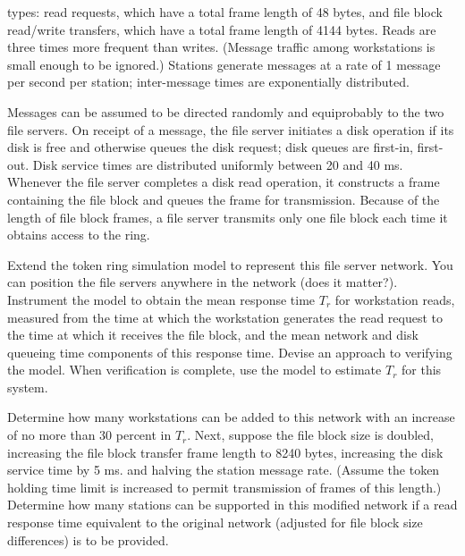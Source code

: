 \noindent types: read requests, which have a total frame length of 48 bytes, and file block read/write transfers, which have a total frame length of 4144 bytes. Reads are three times more frequent than writes. (Message traffic among workstations is small enough to be ignored.) Stations generate messages at a rate of 1 message per second per station; inter-message times are exponentially distributed.

Messages can be assumed to be directed randomly and equiprobably to the two file servers. On receipt of a message, the file server initiates a disk operation if its disk is free and otherwise queues the disk request; disk queues are first-in, first-out. Disk service times are distributed uniformly between 20 and 40 ms. Whenever the file server completes a disk read operation, it constructs a frame containing the file block and queues the frame for transmission. Because of the length of file block frames, a file server transmits only one file block each time it obtains access to the ring.

Extend the token ring simulation model to represent this file server network. You can position the file servers anywhere in the network (does it matter?). Instrument the model to obtain the mean response time $T_r$ for workstation reads, measured from the time at which the workstation generates the read request to the time at which it receives the file block, and the mean network and disk queueing time components of this response time. Devise an approach to verifying the model. When verification is complete, use the model to estimate $T_r$ for this system.

Determine how many workstations can be added to this network with an increase of no more than 30 percent in $T_r$. Next, suppose the file block size is doubled, increasing the file block transfer frame length to 8240 bytes, increasing the disk service time by 5 ms. and halving the station message rate. (Assume the token holding time limit is increased to permit transmission of frames of this length.) Determine how many stations can be supported in this modified network if a read response time equivalent to the original network (adjusted for file block size differences) is to be provided.

